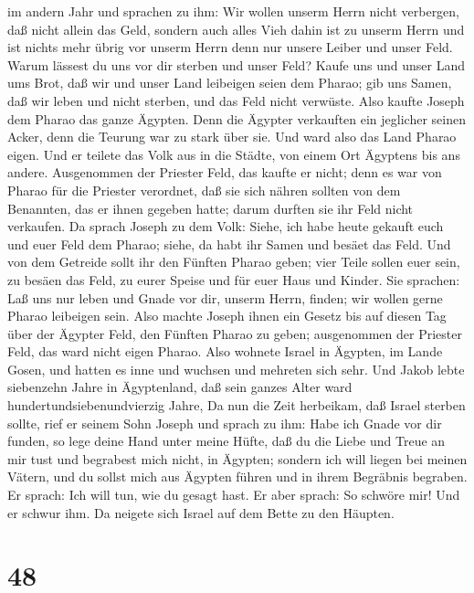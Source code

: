 im andern Jahr und sprachen zu ihm: Wir wollen unserm Herrn nicht
verbergen, daß nicht allein das Geld, sondern auch alles Vieh dahin ist
zu unserm Herrn und ist nichts mehr übrig vor unserm Herrn denn nur
unsere Leiber und unser Feld.  Warum lässest du uns vor dir
sterben und unser Feld? Kaufe uns und unser Land ums Brot, daß wir und
unser Land leibeigen seien dem Pharao; gib uns Samen, daß wir leben und
nicht sterben, und das Feld nicht verwüste.  Also kaufte
Joseph dem Pharao das ganze Ägypten. Denn die Ägypter verkauften ein
jeglicher seinen Acker, denn die Teurung war zu stark über sie. Und ward
also das Land Pharao eigen.  Und er teilete das Volk aus in
die Städte, von einem Ort Ägyptens bis ans andere. 
Ausgenommen der Priester Feld, das kaufte er nicht; denn es war von
Pharao für die Priester verordnet, daß sie sich nähren sollten von dem
Benannten, das er ihnen gegeben hatte; darum durften sie ihr Feld nicht
verkaufen.  Da sprach Joseph zu dem Volk: Siehe, ich habe
heute gekauft euch und euer Feld dem Pharao; siehe, da habt ihr Samen
und besäet das Feld.  Und von dem Getreide sollt ihr den
Fünften Pharao geben; vier Teile sollen euer sein, zu besäen das Feld,
zu eurer Speise und für euer Haus und Kinder.  Sie
sprachen: Laß uns nur leben und Gnade vor dir, unserm Herrn, finden; wir
wollen gerne Pharao leibeigen sein.  Also machte Joseph
ihnen ein Gesetz bis auf diesen Tag über der Ägypter Feld, den Fünften
Pharao zu geben; ausgenommen der Priester Feld, das ward nicht eigen
Pharao.  Also wohnete Israel in Ägypten, im Lande Gosen,
und hatten es inne und wuchsen und mehreten sich sehr.  Und
Jakob lebte siebenzehn Jahre in Ägyptenland, daß sein ganzes Alter ward
hundertundsiebenundvierzig Jahre,  Da nun die Zeit
herbeikam, daß Israel sterben sollte, rief er seinem Sohn Joseph und
sprach zu ihm: Habe ich Gnade vor dir funden, so lege deine Hand unter
meine Hüfte, daß du die Liebe und Treue an mir tust und begrabest mich
nicht, in Ägypten;  sondern ich will liegen bei meinen
Vätern, und du sollst mich aus Ägypten führen und in ihrem Begräbnis
begraben. Er sprach: Ich will tun, wie du gesagt hast.  Er
aber sprach: So schwöre mir! Und er schwur ihm. Da neigete sich Israel
auf dem Bette zu den Häupten.

\hypertarget{section-47}{%
\section{48}\label{section-47}}

